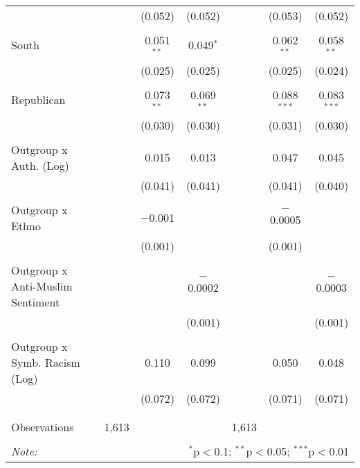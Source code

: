 \begin{table}[H]
{\begin{tabular}{@{\extracolsep{5pt}}lcccccc}
  &  & (0.052) & (0.052) &  & (0.053) & (0.052) \\ 
  & & & & & & \\ 
 South &  & 0.051$^{**}$ & 0.049$^{*}$ &  & 0.062$^{**}$ & 0.058$^{**}$ \\ 
  &  & (0.025) & (0.025) &  & (0.025) & (0.024) \\ 
  & & & & & & \\ 
 Republican &  & 0.073$^{**}$ & 0.069$^{**}$ &  & 0.088$^{***}$ & 0.083$^{***}$ \\ 
  &  & (0.030) & (0.030) &  & (0.031) & (0.030) \\ 
  & & & & & & \\ 
 Outgroup x Auth. (Log) &  & 0.015 & 0.013 &  & 0.047 & 0.045 \\ 
  &  & (0.041) & (0.041) &  & (0.041) & (0.040) \\ 
  & & & & & & \\ 
 Outgroup x Ethno &  & $-$0.001 &  &  & $-$0.0005 &  \\ 
  &  & (0.001) &  &  & (0.001) &  \\ 
  & & & & & & \\ 
 Outgroup x Anti-Muslim Sentiment &  &  & $-$0.0002 &  &  & $-$0.0003 \\ 
  &  &  & (0.001) &  &  & (0.001) \\ 
  & & & & & & \\ 
 Outgroup x Symb. Racism (Log) &  & 0.110 & 0.099 &  & 0.050 & 0.048 \\ 
  &  & (0.072) & (0.072) &  & (0.071) & (0.071) \\ 
  & & & & & & \\ 
\hline \\[-1.8ex] 
Observations & 1,613 &  &  & 1,613 &  &  \\ 
\hline 
\hline \\[-1.8ex] 
\textit{Note:}  & \multicolumn{6}{r}{$^{*}$p$<$0.1; $^{**}$p$<$0.05; $^{***}$p$<$0.01} \\ 
\end{tabular}} 
\end{table} 
